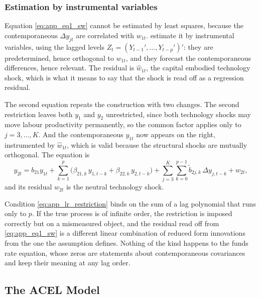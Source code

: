 \documentclass[12pt, a4paper]{article}
\begin{document}
\begin{appendices}
\subsubsection*{Estimation by instrumental variables}

Equation \eqref{eq:app_eq1_sw} cannot be estimated by least squares, because the contemporaneous
$\Delta y_{jt}$ are correlated with $w_{1t}$. \citet{Shapiro_Watson88} estimate it by
instrumental variables, using the lagged levels $Z_t = (Y_{t-1}',\dots,Y_{t-p}')'$: they are
predetermined, hence orthogonal to $w_{1t}$, and they forecast the contemporaneous differences,
hence relevant. The residual is $\hat{w}_{1t}$, the capital embodied technology shock, which is
what it means to say that the shock is read off as a regression residual.

The second equation repeats the construction with two changes. The second restriction leaves
both $y_1$ and $y_2$ unrestricted, since both technology shocks may move labour productivity
permanently, so the common factor applies only to $j = 3,\dots,K$. And the contemporaneous
$y_{1t}$ now appears on the right, instrumented by $\hat{w}_{1t}$, which is valid because the
structural shocks are mutually orthogonal. The equation is
\begin{equation}
    y_{2t} = b_{21}y_{1t}
           + \sum_{k=1}^{p}\bigl(\beta_{21,k}\,y_{1,t-k} + \beta_{22,k}\,y_{2,t-k}\bigr)
           + \sum_{j=3}^{K}\sum_{k=0}^{p-1}\tilde{b}_{2j,k}\,\Delta y_{j,t-k} + w_{2t},
    \label{eq:app_eq2_sw}
\end{equation}
and its residual $\hat{w}_{2t}$ is the neutral technology shock.

Condition \eqref{eq:app_lr_restriction} binds on the sum of a lag polynomial that runs only to
$p$. If the true process is of infinite order, the restriction is imposed correctly but on a
mismeasured object, and the residual read off from \eqref{eq:app_eq1_sw} is a different linear
combination of reduced form innovations from the one the assumption defines. Nothing of the kind
happens to the funds rate equation, whose zeros are statements about contemporaneous covariances
and keep their meaning at any lag order.

\clearpage

\subsection{The ACEL Model}
\label{app:model}


\end{appendices}
\end{document}
